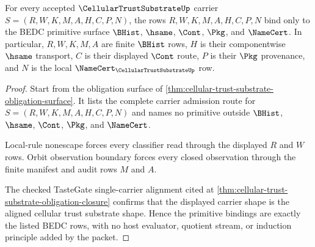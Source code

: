 \begin{theorem}
\label{thm:cellular-trust-substrate-primitive-scope-binding}
For every accepted $\CellularTrustSubstrateUp$ carrier $S=(R,W,K,M,A,H,C,P,N)$, the rows $R,W,K,M,A,H,C,P,N$ bind only to the BEDC primitive surface $\BHist$, $\hsame$, $\Cont$, $\Pkg$, and $\NameCert$. In particular, $R,W,K,M,A$ are finite $\BHist$ rows, $H$ is their componentwise $\hsame$ transport, $C$ is their displayed $\Cont$ route, $P$ is their $\Pkg$ provenance, and $N$ is the local $\NameCert_{\CellularTrustSubstrateUp}$ row.
\end{theorem}
\begin{proof}
Start from the obligation surface of \autoref{thm:cellular-trust-substrate-obligation-surface}. It lists the complete carrier admission route for $S=(R,W,K,M,A,H,C,P,N)$ and names no primitive outside $\BHist$, $\hsame$, $\Cont$, $\Pkg$, and $\NameCert$.

Local-rule nonescape forces every classifier read through the displayed $R$ and $W$ rows. Orbit observation boundary forces every closed observation through the finite manifest and audit rows $M$ and $A$.

The checked TasteGate single-carrier alignment cited at \autoref{thm:cellular-trust-substrate-obligation-closure} confirms that the displayed carrier shape is the aligned cellular trust substrate shape. Hence the primitive bindings are exactly the listed BEDC rows, with no host evaluator, quotient stream, or induction principle added by the packet.
\end{proof}

